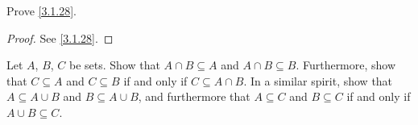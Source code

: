 \begin{ex}\label{ex:3.1.6}
  Prove \cref{3.1.28}.
\end{ex}

\begin{proof}
  See \cref{3.1.28}.
\end{proof}

\begin{ex}\label{ex:3.1.7}
  Let \(A\), \(B\), \(C\) be sets.
  Show that \(A \cap B \subseteq A\) and \(A \cap B \subseteq B\).
  Furthermore, show that \(C \subseteq A\) and \(C \subseteq B\) if and only if \(C \subseteq A \cap B\).
  In a similar spirit, show that \(A \subseteq A \cup B\) and \(B \subseteq A \cup B\), and furthermore that \(A \subseteq C\) and \(B \subseteq C\) if and only if \(A \cup B \subseteq C\).
\end{ex}

